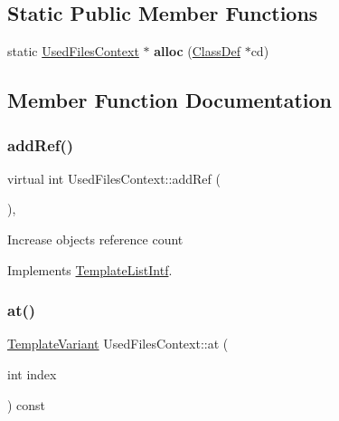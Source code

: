 \subsection*{Static Public Member Functions}
\begin{DoxyCompactItemize}
\item 
\mbox{\label{class_used_files_context_a93b8da9fd2c2350add1b6fd65d5f95d5}} 
static \mbox{\hyperlink{class_used_files_context}{Used\+Files\+Context}} $\ast$ {\bfseries alloc} (\mbox{\hyperlink{class_class_def}{Class\+Def}} $\ast$cd)
\end{DoxyCompactItemize}


\subsection{Member Function Documentation}
\mbox{\label{class_used_files_context_a3346f9de5fe74a7c0b962fa546240298}} 
\subsubsection{\texorpdfstring{addRef()}{addRef()}}
{\footnotesize\ttfamily virtual int Used\+Files\+Context\+::add\+Ref (\begin{DoxyParamCaption}{ }\end{DoxyParamCaption})\hspace{0.3cm}{\ttfamily [inline]}, {\ttfamily [virtual]}}

Increase object\textquotesingle{}s reference count 

Implements \mbox{\hyperlink{class_template_list_intf_a4b4973e2e15396d10bc4e3085462ca2b}{Template\+List\+Intf}}.

\mbox{\label{class_used_files_context_a635972ef6dd5be8afd3b6c069c413dde}} 
\subsubsection{\texorpdfstring{at()}{at()}}
{\footnotesize\ttfamily \mbox{\hyperlink{class_template_variant}{Template\+Variant}} Used\+Files\+Context\+::at (\begin{DoxyParamCaption}\item[{int}]{index }\end{DoxyParamCaption}) const\hspace{0.3cm}{\ttfamily [virtual]}}


